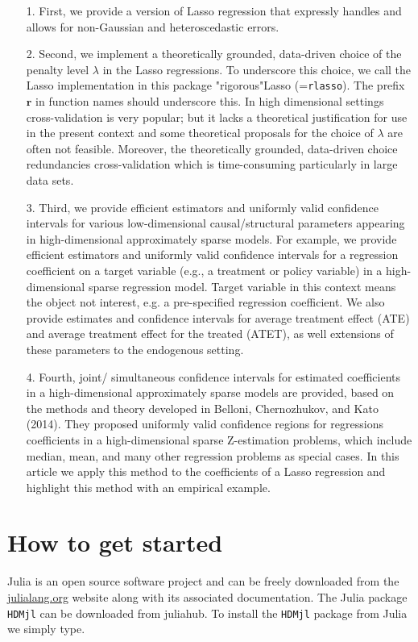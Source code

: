 \documentclass[12pt,a4paper]{article}
\begin{document}
\begin{itemize}
\item[1. ] First, we provide a version of Lasso regression that expressly handles and allows for non-Gaussian and heteroscedastic errors.


\item[2. ] Second, we implement a theoretically grounded, data-driven choice of the penalty level $\lambda$ in the Lasso regressions. To underscore this choice, we call the Lasso implementation in this package "rigorous"Lasso (=\texttt{rlasso}). The prefix $\mathbf{r}$ in function names should underscore this. In high dimensional settings cross-validation is very popular; but it lacks a theoretical justification for use in the present context and some theoretical proposals for the choice of $\lambda$ are often not feasible. Moreover, the theoretically grounded, data-driven choice redundancies cross-validation which is time-consuming particularly in large data sets.


\item[3. ] Third, we provide efficient estimators and uniformly valid confidence intervals for various low-dimensional causal/structural parameters appearing in high-dimensional approximately sparse models. For example, we provide efficient estimators and uniformly valid confidence intervals for a regression coefficient on a target variable (e.g., a treatment or policy variable) in a high-dimensional sparse regression model. Target variable in this context means the object not interest, e.g. a pre-specified regression coefficient. We also provide estimates and confidence intervals for average treatment effect (ATE) and average treatment effect for the treated (ATET), as well extensions of these parameters to the endogenous setting.


\item[4. ] Fourth, joint/ simultaneous confidence intervals for estimated coefficients in a high-dimensional approximately sparse models are provided, based on the methods and theory developed in Belloni, Chernozhukov, and Kato (2014). They proposed uniformly valid confidence regions for regressions coefficients in a high-dimensional sparse Z-estimation problems, which include median, mean, and many other regression problems as special cases. In this article we apply this method to the coefficients of a Lasso regression and highlight this method with an empirical example.

\end{itemize}
\section{How to get started}
Julia is an open source software project and can be freely downloaded from the \href{julialang.org}{julialang.org} website along with its associated documentation. The Julia package \texttt{HDMjl} can be downloaded from juliahub. To install the \texttt{HDMjl} package from Julia we simply type.
\end{document}
